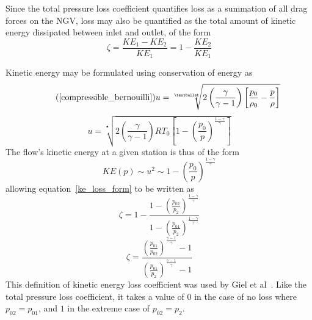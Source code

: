 \documentclass[a4paper, 11pt, oneside]{report}
\begin{document}
Since the total pressure loss coefficient quantifies loss as a summation of all drag forces on the NGV, loss may also be quantified as the total amount of kinetic energy dissipated between inlet and outlet, of the form
\begin{equation}\label{ke_loss_form}
\zeta =
\frac{KE_1 - KE_2}{KE_1}
=
1 - \frac{KE_2}{KE_1}
\end{equation}

Kinetic energy may be formulated using conservation of energy as
\begin{equation}\tag{\ref{compressible_bernouilli}}
u = 
\sqrt[•]{ 
2 \left( \frac{\gamma}{\gamma - 1} \right) \left[ \frac{p_0}{\rho_0} - \frac{p}{\rho} \right] 
}
\end{equation}
\begin{equation}
u =
\sqrt[•]{ 
	2 \left( \frac{\gamma}{\gamma - 1} \right)
	R T_0
	\left[
		1 - \left(
			\frac{p_0}{p}
		\right)
		^\frac{1-\gamma}{\gamma}
	\right] 
}
\end{equation}
The flow's kinetic energy at a given station is thus of the form
\begin{equation}
KE(p) 
\sim
u^2
\sim
1 - \left(
	\frac{p_0}{p}
\right)
^\frac{1-\gamma}{\gamma}
\end{equation}
allowing equation~\ref{ke_loss_form} to be written as
\begin{equation}
\zeta = 
1 - 
\frac{
	1 -
	\left(
		\frac{p_{02}}{p_2}
	\right)
	^\frac{1-\gamma}{\gamma}
}{
	1 -
	\left(
		\frac{p_{01}}{p_2}
	\right)
	^\frac{1-\gamma}{\gamma}
}
\end{equation}
\begin{equation}\label{ke_loss_definition}
\zeta = 
\frac{ 
	\left(
		\frac{p_{01}}{p_{02}}
	\right)
	^\frac{\gamma-1}{ \gamma } - 1 
}{
	\left(
	\frac{p_{01}}{p_{2}}
	\right)
	^\frac{\gamma-1}{ \gamma } - 1 
}
\end{equation}
This definition of kinetic energy loss coefficient was used by Giel et al~\cite{giel_te_thickness}. Like the total pressure loss coefficient, it takes a value of $0$ in the case of no loss where $p_{02} = p_{01}$, and $1$ in the extreme case of $p_{02} = p_2$.
\end{document}
